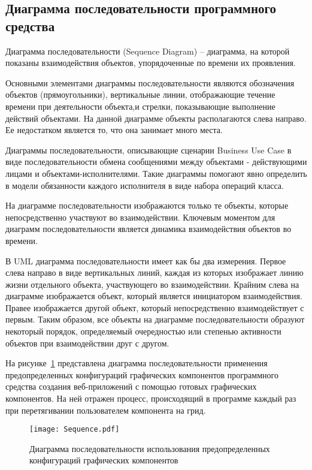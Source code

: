 \subsection{Диаграмма последовательности программного средства}
\label{sec:modeling:sequence_diagram}

Диаграмма последовательности (Sequence Diagram) – диаграмма, на которой показаны взаимодействия объектов, упорядоченные по времени их проявления.

Основными элементами диаграммы последовательности являются обозначения объектов (прямоугольники), вертикальные линии, отображающие течение времени при деятельности объекта,и стрелки, показывающие выполнение действий объектами. На данной диаграмме объекты располагаются слева направо. Ее недостатком является то, что она занимает много места.

Диаграммы последовательности, описывающие сценарии Business Use Case в виде последовательности обмена сообщениями между объектами - действующими лицами и объектами-исполнителями. Такие диаграммы помогают явно определить в модели обязанности каждого исполнителя в виде набора операций класса.

На диаграмме последовательности изображаются только те объекты, которые непосредственно участвуют во взаимодействии. Ключевым моментом для диаграмм последовательности является динамика взаимодействия объектов во времени.

В UML диаграмма последовательности имеет как бы два измерения. Первое слева направо в виде вертикальных линий, каждая из которых изображает линию жизни отдельного объекта, участвующего во взаимодействии. Крайним слева на диаграмме изображается объект, который является инициатором взаимодействия. Правее изображается другой объект, который непосредственно взаимодействует с первым. Таким образом, все объекты на диаграмме последовательности образуют некоторый порядок, определяемый очередностью или степенью активности объектов при взаимодействии друг с другом.

На рисунке~\ref{sec:design:sequence} представлена диаграмма последовательности применения предопределенных конфигураций графических компонентов программного средства создания веб-приложений с помощью готовых графических компонентов. 
На ней отражен процесс, происходящий в программе каждый раз при перетягивании пользователем компонента на грид.

\begin{figure}
\centering
    \texttt{[image: Sequence.pdf]}
    \caption{Диаграмма последовательности использования предопределенных конфигураций графических компонентов}
    \label{sec:design:sequence}
\end{figure}
